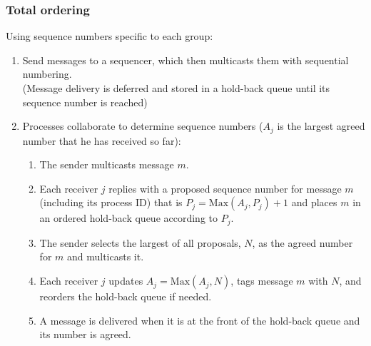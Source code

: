 \subsubsection{Total ordering}
 Using sequence numbers specific to each group:
    \begin{enumerate}
        \item Send messages to a sequencer, which then multicasts them with sequential numbering.
        \\
        (Message delivery is deferred and stored in a hold-back queue until its sequence number is reached)
        
        
        \item Processes collaborate to determine sequence numbers (\(A_j\) is the largest agreed number that he has received so far):
        \begin{enumerate}
    \item The sender multicasts message \( m \).
    \item Each receiver \( j \) replies with a proposed sequence number for message \( m \) (including its process ID) that is \( P_j = \text{Max}(A_j, P_j) + 1 \) and places \( m \) in an ordered hold-back queue according to \( P_j \).
    \item The sender selects the largest of all proposals, \( N \), as the agreed number for \( m \) and multicasts it.
    \item Each receiver \( j \) updates \( A_j = \text{Max}(A_j, N) \), tags message \( m \) with \( N \), and reorders the hold-back queue if needed.
    \item A message is delivered when it is at the front of the hold-back queue and its number is agreed.
\end{enumerate}

    \end{enumerate}


